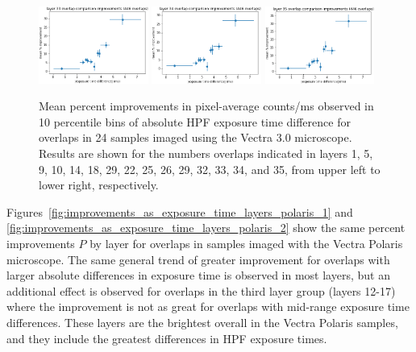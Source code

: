 \documentclass[letterpaper,11pt]{article}
\begin{document}
\begin{figure}[!ht]
\includegraphics[width=0.32\textwidth]{images/results/improvements_by_layer_vectra/layer_33_improvements_vectra}
\includegraphics[width=0.32\textwidth]{images/results/improvements_by_layer_vectra/layer_34_improvements_vectra}
\includegraphics[width=0.32\textwidth]{images/results/improvements_by_layer_vectra/layer_35_improvements_vectra}
\caption{\footnotesize Mean percent improvements in pixel-average counts/ms observed in 10 percentile bins of absolute HPF exposure time difference for overlaps in 24 samples imaged using the Vectra 3.0 microscope. Results are shown for the numbers overlaps indicated in layers 1, 5, 9, 10, 14, 18, 29, 22, 25, 26, 29, 32, 33, 34, and 35, from upper left to lower right, respectively.}
\label{fig:improvements_as_exposure_time_layers_vectra}
\end{figure}

Figures~\ref{fig:improvements_as_exposure_time_layers_polaris_1} and \ref{fig:improvements_as_exposure_time_layers_polaris_2} show the same percent improvements $P$ by layer for overlaps in samples imaged with the Vectra Polaris microscope. The same general trend of greater improvement for overlaps with larger absolute differences in exposure time is observed in most layers, but an additional effect is observed for overlaps in the third layer group (layers 12-17) where the improvement is not as great for overlaps with mid-range exposure time differences. These layers are the brightest overall in the Vectra Polaris samples, and they include the greatest differences in HPF exposure times. 
\end{document}
